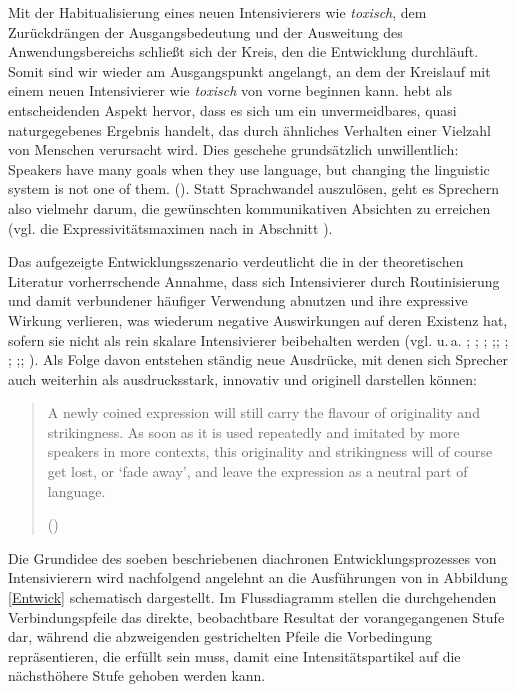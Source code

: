
Mit der Habitualisierung eines neuen Intensivierers wie \textit{toxisch}, dem Zurückdrängen der Ausgangsbedeutung und der Ausweitung des Anwendungsbereichs schließt sich der Kreis, den die Entwicklung durchläuft. Somit sind wir wieder am Ausgangspunkt angelangt, an dem der Kreislauf mit einem neuen Intensivierer wie \textit{toxisch} von vorne beginnen kann. {\citet[92]{Keller.1994}} hebt als entscheidenden Aspekt hervor, dass es sich um ein unvermeidbares, quasi naturgegebenes Ergebnis handelt, das durch ähnliches Verhalten einer Vielzahl von Menschen verursacht wird. Dies geschehe grundsätzlich unwillentlich: \glqq{}Speakers have many goals when they use language, but changing the linguistic system is not one of them.\grqq{} ({\citealt[70]{Croft.2000}}). Statt Sprachwandel auszulösen, geht es Sprechern also vielmehr darum, die gewünschten kommunikativen Absichten zu erreichen (vgl. die Expressivitätsmaximen nach \citealt[]{Kirschbaum.2002b} in Abschnitt {}).


Das aufgezeigte Entwicklungsszenario verdeutlicht die in der theoretischen Literatur vorherrschende Annahme, dass sich Intensivierer durch Routinisierung und damit verbundener häufiger Verwendung abnutzen und ihre expressive Wirkung verlieren, was wiederum negative Auswirkungen auf deren Existenz hat, sofern sie nicht als rein skalare Intensivierer beibehalten werden (vgl. u.\,a. \citealt[2]{Hauschild.1899}; \citealt[253]{Gabelentz.2016}; \citealt[274]{Baumgarten.1908}; \citealt[171f.]{Androutsopoulos.1999};; \citealt[1055]{Haspelmath.1999}; \citealt[3]{Heine.2002a}; \citealt[190f.]{Kirschbaum.2002b};; \citealt[74f.]{Sahel.2013}). Als Folge davon entstehen ständig neue Ausdrücke, mit denen sich Sprecher auch weiterhin als ausdrucksstark, innovativ und originell darstellen können:

\begin{quotation}
\noindent A newly coined expression will still carry the flavour of originality and strikingness. As soon as it is used repeatedly and imitated by more speakers in more contexts, this originality and strikingness will of course get lost, or `fade away', and {leave} the expression as a neutral part of language. \par \hfill (\citealt[30f.]{Eckardt.2006})   \end{quotation}

Die Grundidee des soeben beschriebenen diachronen Entwicklungsprozesses von Intensivierern wird nachfolgend angelehnt an die Ausführungen von \citet[285]{Tagliamonte.2005} in Abbildung \ref{Entwick} schematisch dargestellt. Im Flussdiagramm stellen die durchgehenden Verbindungspfeile das direkte, beobachtbare Resultat der vorangegangenen Stufe dar, während die abzweigenden gestrichelten Pfeile die Vorbedingung repräsentieren, die erfüllt sein muss, damit eine Intensitätspartikel auf die nächsthöhere Stufe gehoben werden kann.


